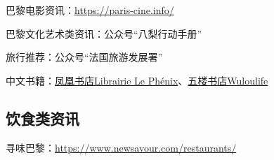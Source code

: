 \documentclass[UTF8]{ctexart}
\begin{document}
巴黎电影资讯：\href{https://paris-cine.info/}{https://paris-cine.info/}

巴黎文化艺术类资讯：公众号“八梨行动手册”

旅行推荐：公众号“法国旅游发展署”

中文书籍：\href{https://www.librairielephenix.fr/}{凤凰书店Librairie Le Phénix}、\href{https://wulolife.com/}{五楼书店Wuloulife}

\subsection{饮食类资讯}

寻味巴黎：\href{https://www.newsavour.com/restaurants/}{https://www.newsavour.com/restaurants/}
\end{document}
